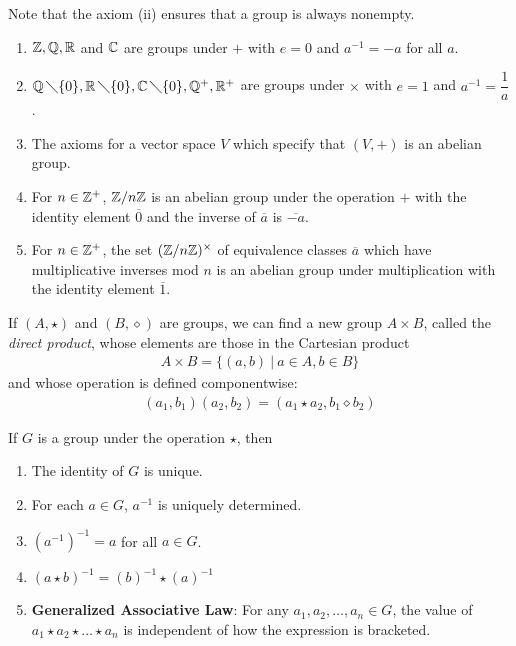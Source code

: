 Note that the axiom (ii) ensures that a group is always nonempty.
{
\begin{enumerate}[leftmargin=20pt, itemsep=0pt, topsep=3pt]
    \item $\mathbb{Z}, \mathbb{Q}, \mathbb{R}$ and $\mathbb{C}$ are groups under $+$ with $e=0$ and $a^{-1} = -a$ for all $a$.
    \item $\mathbb{Q}\,\diagdown\{0\}, \mathbb{R}\,\diagdown\{0\},\mathbb{C}\,\diagdown\{0\}, \mathbb{Q}^{+}, \mathbb{R}^{+}$ are groups
    under $\times$ with $e=1$ and $a^{-1} = \dfrac{1}{a}$.
    \item The axioms for a vector space $V$ which specify that $(V,+)$
    is an abelian group.
    \item For $n\in \mathbb{Z}^{+}$, $\mathbb{Z}/n\mathbb{Z}$ is an abelian group under the operation $+$ with the identity element $\overline{0}$
    and the inverse of $\overline{a}$ is $\overline{-a}$.
    \item For $n\in \mathbb{Z}^{+}$, the set $(\mathbb{Z}/n\mathbb{Z})^{\times}$ of equivalence classes $\overline{a}$ which have multiplicative inverses
    mod $n$ is an abelian group under multiplication with the identity element $\overline{1}$.
\end{enumerate}
}
If $(A,\star)$ and $(B,\diamond)$ are groups, we can find a new group $A\times B$, called the {\sl direct product}, whose elements are those in the Cartesian product
\begin{align*}
    A\times B = \{(a,b)\ |\ a\in A, b\in B\}
\end{align*}
and whose operation is defined componentwise:
\begin{align*}
    (a_{1}, b_{1})(a_{2}, b_{2}) = (a_{1}\star a_{2}, b_{1}\diamond b_{2})
\end{align*}
{If $G$ is a group under the operation $\star$, then
\begin{enumerate}[leftmargin=20pt, itemsep=0pt, topsep=3pt]
    \item The identity of $G$ is unique.
    \item For each $a\in G$, $a^{-1}$ is uniquely determined.
    \item $(a^{-1})^{-1} = a$ for all $a\in G$.
    \item $(a\star b)^{-1} = (b)^{-1}\star(a)^{-1}$
    \item {\bf Generalized Associative Law}: For any $a_{1}, a_{2},\dots,a_{n}\in G$, the value of $a_{1}\star a_{2}\star\dots\star a_{n}$
    is independent of how the expression is bracketed.
\end{enumerate}
}
